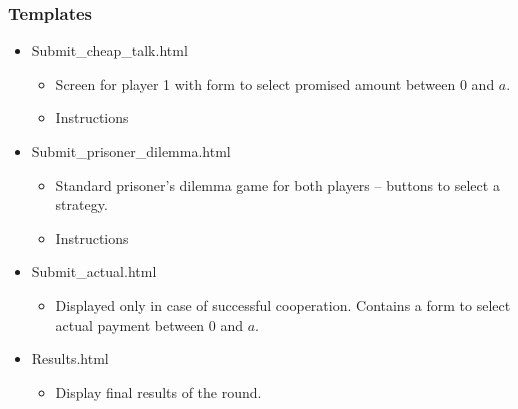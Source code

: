 \documentclass{beamer}
\begin{document}
\begin{frame}
\frametitle{Templates} 

\begin{itemize}
  \item Submit\_cheap\_talk.html
	\begin{itemize}
		\item Screen for player 1 with form to select promised amount between 0 and $a$. 
		\item Instructions
	\end{itemize}
  
	\item Submit\_prisoner\_dilemma.html
	\begin{itemize}
		\item Standard prisoner's dilemma game for both players -- buttons to select a strategy.
		\item Instructions
	\end{itemize}
  
	\item Submit\_actual.html
	\begin{itemize}
		\item Displayed only in case of successful cooperation. Contains a form to select actual payment between 0 and $a$. 
	\end{itemize}

	\item Results.html
	\begin{itemize}
		\item Display final results of the round. 
	\end{itemize}	

\end{itemize}

\end{frame}
\end{document}
